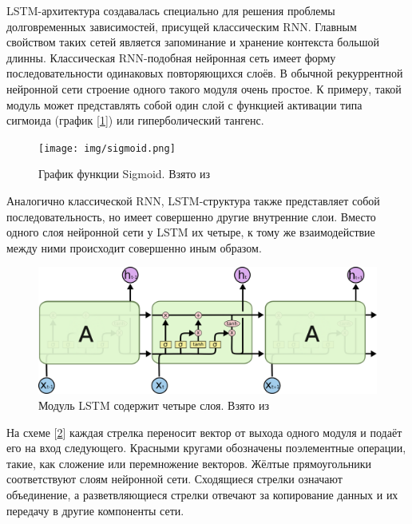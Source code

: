 \documentclass[14pt]{extarticle}
\begin{document}
LSTM-архитектура создавалась специально для решения проблемы долговременных зависимостей, присущей классическим RNN. Главным свойством таких сетей является запоминание и хранение контекста большой длинны. Классическая RNN-подобная нейронная сеть имеет форму последовательности одинаковых повторяющихся слоёв. В обычной рекуррентной нейронной сети строение одного такого модуля очень простое. К примеру, такой модуль может представлять собой один слой с функцией активации типа сигмоида (график [\ref{fig:sigmoid}]) или гиперболический тангенс.

\begin{figure}[h]
	\centering
	\texttt{[image: img/sigmoid.png]}
	\caption{График функции Sigmoid. Взято из \cite{Sigmoid-Wiki}}
	\label{fig:sigmoid}
\end{figure}


Аналогично классической RNN, LSTM-структура также представляет собой последовательность, но имеет совершенно другие внутренние слои. Вместо одного слоя нейронной сети у LSTM их четыре, к тому же взаимодействие между ними происходит совершенно иным образом. 

\begin{figure}[h]
	\centering
	\includegraphics[width=1\textwidth]{img/LSTM-chain.png}
	\caption{Модуль LSTM содержит четыре слоя. Взято из \cite{Colah}}
	\label{fig:lstm}
\end{figure}

На схеме [\ref{fig:lstm}] каждая стрелка переносит вектор от выхода одного модуля и подаёт его на вход следующего. Красными кругами обозначены поэлементные операции, такие, как сложение или перемножение векторов. Жёлтые прямоугольники соответствуют слоям нейронной сети. Сходящиеся стрелки означают объединение, а разветвляющиеся стрелки отвечают за копирование данных и их передачу в другие компоненты сети.
\end{document}
